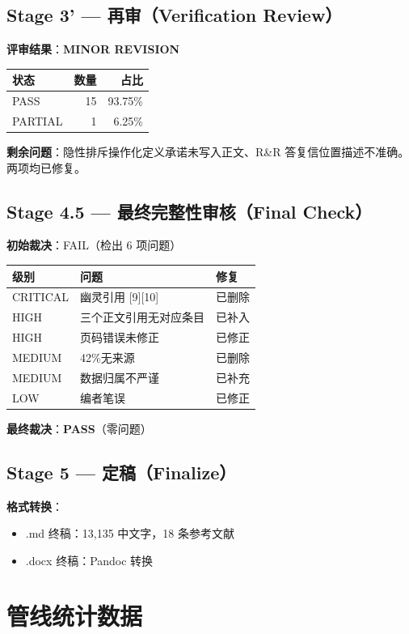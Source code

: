 \documentclass[12pt,a4paper]{article}
\begin{document}
\subsection{Stage 3' — 再审（Verification Review）}

\textbf{评审结果}：\textbf{MINOR REVISION}

\begin{tabular}{lrr}
\hline
\textbf{状态} & \textbf{数量} & \textbf{占比} \\
\hline
PASS & 15 & 93.75\% \\
PARTIAL & 1 & 6.25\% \\
\hline
\end{tabular}

\textbf{剩余问题}：隐性排斥操作化定义承诺未写入正文、R\&R 答复信位置描述不准确。两项均已修复。

\subsection{Stage 4.5 — 最终完整性审核（Final Check）}

\textbf{初始裁决}：FAIL（检出 6 项问题）

\begin{tabular}{lll}
\hline
\textbf{级别} & \textbf{问题} & \textbf{修复} \\
\hline
CRITICAL & 幽灵引用 [9][10] & 已删除 \\
HIGH & 三个正文引用无对应条目 & 已补入 \\
HIGH & 页码错误未修正 & 已修正 \\
MEDIUM & 42\%无来源 & 已删除 \\
MEDIUM & 数据归属不严谨 & 已补充 \\
LOW & 编者笔误 & 已修正 \\
\hline
\end{tabular}

\textbf{最终裁决}：\textbf{PASS}（零问题）

\subsection{Stage 5 — 定稿（Finalize）}

\textbf{格式转换}：
\begin{itemize}
    \item .md 终稿：13,135 中文字，18 条参考文献
    \item .docx 终稿：Pandoc 转换
\end{itemize}

\section{管线统计数据}
\end{document}
